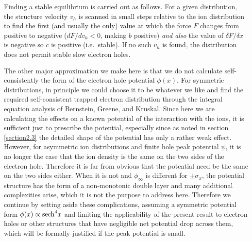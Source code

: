 \documentclass[pre]{revtex4-2}
\begin{document}
Finding a stable equilibrium is carried out as follows.  For a given
distribution, the structure velocity $v_h$ is scanned in small steps
relative to the ion distribution to find the first (and usually the
only) value at which the force $F$ changes from positive to negative
($dF/dv_h<0$, making $b$ positive) \emph{and also} the value of
$\delta F/\delta x$ is negative so $c$ is positive (i.e.\ stable). If
no such $v_h$ is found, the distribution does not permit stable slow
electron holes. 

The other major approximation we make here is that we do not calculate
self-consistently the form of the electron hole potential
$\phi(x)$. For symmetric distributions, in principle we could choose
it to be whatever we like and find the required self-consistent
trapped electron distribution through the integral equation analysis
of Bernstein, Greene, and Kruskal\cite{Bernstein1957,Hutchinson2017}. Since here we
are calculating the effects on a known potential of the interaction
with the ions, it is sufficient just to prescribe the potential,
especially since as noted in section \ref{section2.3} the detailed
shape of the potential has only a rather weak effect. However, for
asymmetric ion distributions and finite hole peak potential $\psi$, it
is no longer the case that the ion density is the same on the two
sides of the electron hole. Therefore it is far from obvious that the
potential need be the same on the two sides either. When it is not and
$\phi_\infty$ is different for $\pm\sigma_x$, the potential structure
has the form of a non-monotonic double layer\cite{Raadu1989} and many
additional complexities arise, which it is not the purpose to address
here. Therefore we continue by setting aside these complications,
assuming a symmetric potential form $\phi(x)\propto{\rm sech}^4x$ and
limiting the applicability of the present result to electron holes or
other structures that have negligible net potential drop across them,
which will be formally justified if the peak potential is small.
\end{document}
